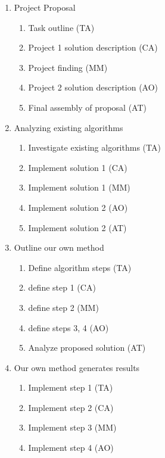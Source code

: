 \documentclass[11pt, a4paper]{article}
\begin{document}
    \begin{multicols}{3}
        \begin{enumerate}
            \item Project Proposal
            \begin{enumerate}
                \item Task outline (TA)
                \item Project 1 solution description (CA)
                \item Project finding (MM)
                \item Project 2 solution description (AO)
                \item Final assembly of proposal (AT)
            \end{enumerate}
            \item Analyzing existing algorithms
            \begin{enumerate}
                \item Investigate existing algorithms (TA)
                \item Implement solution 1 (CA)
                \item Implement solution 1 (MM)
                \item Implement solution 2 (AO)
                \item Implement solution 2 (AT)
            \end{enumerate}
           \item Outline our own method
            \begin{enumerate}
                \item Define algorithm steps (TA)
                \item define step 1 (CA)
                \item define step 2 (MM)
                \item define steps 3, 4 (AO)
                \item Analyze proposed solution (AT)
            \end{enumerate}
            \item Our own method generates results
            \begin{enumerate}
                \item Implement step 1 (TA)
                \item Implement step 2 (CA)
                \item Implement step 3 (MM)
                \item Implement step 4 (AO)

\end{enumerate}
\end{enumerate}
\end{multicols}
\end{document}
